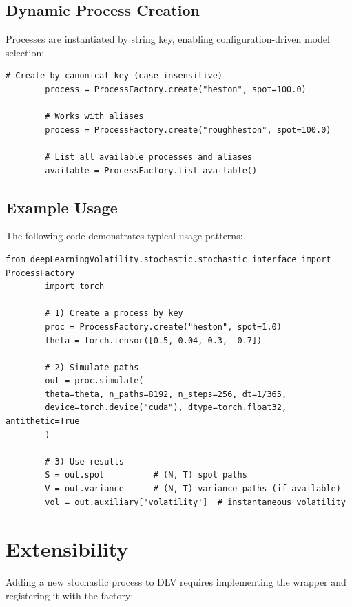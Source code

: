 	\subsection{Dynamic Process Creation}
	Processes are instantiated by string key, enabling configuration-driven model selection:
	
	\begin{lstlisting}[style=cleanpy]
		# Create by canonical key (case-insensitive)
		process = ProcessFactory.create("heston", spot=100.0)
		
		# Works with aliases
		process = ProcessFactory.create("roughheston", spot=100.0)
		
		# List all available processes and aliases
		available = ProcessFactory.list_available()
	\end{lstlisting}
	
	\subsection{Example Usage}
	The following code demonstrates typical usage patterns:
	
	\begin{lstlisting}[style=cleanpy]
		from deepLearningVolatility.stochastic.stochastic_interface import ProcessFactory
		import torch
		
		# 1) Create a process by key
		proc = ProcessFactory.create("heston", spot=1.0)
		theta = torch.tensor([0.5, 0.04, 0.3, -0.7])
		
		# 2) Simulate paths
		out = proc.simulate(
		theta=theta, n_paths=8192, n_steps=256, dt=1/365,
		device=torch.device("cuda"), dtype=torch.float32, antithetic=True
		)
		
		# 3) Use results
		S = out.spot          # (N, T) spot paths
		V = out.variance      # (N, T) variance paths (if available)
		vol = out.auxiliary['volatility']  # instantaneous volatility
	\end{lstlisting}
	
	\section{Extensibility}
	
	Adding a new stochastic process to DLV requires implementing the wrapper and registering it with the factory:
	
